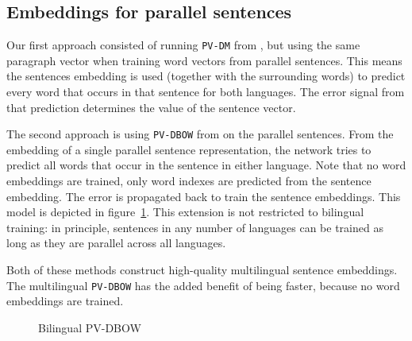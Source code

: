 \subsection{Embeddings for parallel sentences}



Our first approach consisted of running \texttt{PV-DM} from \cite{Le2014}, 
but using the same paragraph vector when training word vectors from parallel sentences.
This means the sentences embedding is used (together with the surrounding words) to predict every word that occurs in that sentence for both languages.
The error signal from that prediction determines the value of the sentence vector.



The second approach is using \texttt{PV-DBOW} from \cite{Le2014} on the parallel sentences.
From the embedding of a single parallel sentence representation, the network tries to predict all words that occur in the sentence in either language.
Note that no word embeddings are trained, only word indexes are predicted from the sentence embedding.
The error is propagated back to train the sentence embeddings.
This model is depicted in figure~\ref{f:bilingual_dbow}. This extension is not restricted to bilingual training: in principle, sentences in any number of languages can be trained as long as they are parallel across all languages.


Both of these methods construct high-quality multilingual sentence embeddings. %
The multilingual \texttt{PV-DBOW} has the added benefit of being faster, because no word embeddings are trained.


\begin{figure}

\center

\caption{Bilingual PV-DBOW}
\label{f:bilingual_dbow}
\end{figure}


% 

